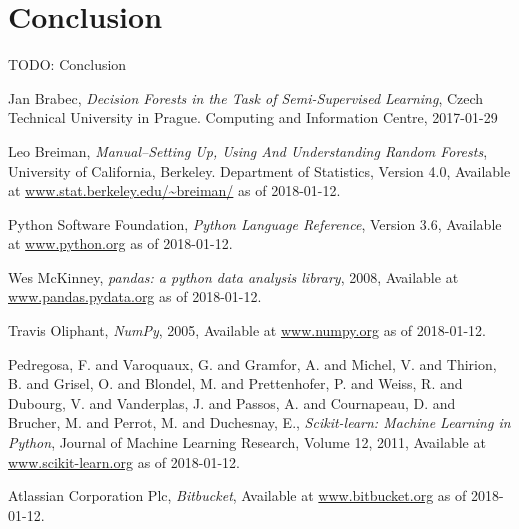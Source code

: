 \documentclass[11pt]{article}
\begin{document}
  \section*{Conclusion}
    TODO: Conclusion
  \newpage
  \begin{thebibliography}{9}
      Jan Brabec,
      {\it Decision Forests in the Task of Semi-Supervised Learning},
      Czech Technical University in Prague. Computing and Information Centre, 
      2017-01-29

      Leo Breiman,
      {\it Manual--Setting Up, Using And Understanding Random Forests},
      University of California, Berkeley. Department of Statistics,
      Version 4.0,
      Available at \url{www.stat.berkeley.edu/~breiman/} as of 2018-01-12.
    
      Python Software Foundation,
      {\it Python Language Reference},
      Version 3.6,
      Available at \url{www.python.org} as of 2018-01-12.
 
      Wes McKinney,
      {\it pandas: a python data analysis library},
      2008,
      Available at \url{www.pandas.pydata.org} as of 2018-01-12.

      Travis Oliphant,
      {\it NumPy},
      2005,
      Available at \url{www.numpy.org} as of 2018-01-12.

      Pedregosa, F. and Varoquaux, G. and Gramfor, A. and Michel, V. and Thirion, B. and Grisel, O. and Blondel, M. and Prettenhofer, P. and Weiss, R. and Dubourg, V. and Vanderplas, J. and Passos, A. and Cournapeau, D. and Brucher, M. and Perrot, M. and Duchesnay, E.,
      {\it Scikit-learn: Machine Learning in Python},
      Journal of Machine Learning Research,
      Volume 12,
      2011,
      Available at \url{www.scikit-learn.org} as of 2018-01-12.

      Atlassian Corporation Plc,
      {\it Bitbucket},
      Available at \url{www.bitbucket.org} as of 2018-01-12.
       
  \end{thebibliography}
\end{document}
